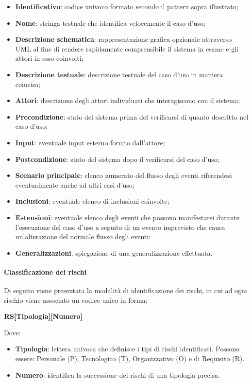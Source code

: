 \begin{itemize}
  \item \textbf{Identificativo}: codice univoco formato secondo il pattern sopra illustrato;
  \item \textbf{Nome}: stringa testuale che identifica velocemente il caso d'uso;
  \item \textbf{Descrizione schematica}: rappresentazione grafica opzionale attraverso UML al fine di rendere rapidamente comprensibile il sistema in esame e gli attori in esso coinvolti;
  \item \textbf{Descrizione testuale}: descrizione testuale del caso d'uso in maniera coincisa;
  \item \textbf{Attori}: descrizione degli attori individuati che interagiscono con il sistema;
  \item \textbf{Precondizione}: stato del sistema prima del verificarsi di quanto descritto nel caso d'uso;
  \item \textbf{Input}: eventuale input esterno fornito dall'attore;
  \item \textbf{Postcondizione}: stato del sistema dopo il verificarsi del caso d'uso;
  \item \textbf{Scenario principale}: elenco numerato del flusso degli eventi riferendosi eventualmente anche ad altri casi d'uso;
  \item \textbf{Inclusioni}: eventuale elenco di inclusioni coinvolte;
  \item \textbf{Estensioni}: eventuale elenco degli eventi che possono manifestarsi durante l'esecuzione del caso d'uso a seguito di un evento imprevisto che causa un'alterazione del normale flusso degli eventi;
  \item \textbf{Generalizzazioni}: spiegazione di una generalizzazione effettuata.
\end{itemize}

\paragraph{Classificazione dei rischi} \label{_classificazioneDeiRischi}
Di seguito viene presentata la modalità di identificazione dei rischi, in cui ad ogni rischio viene associato un codice unico in forma:
\begin{center}
	\textbf{RS[Tipologia][Numero]}
\end{center}
Dove: 
\begin{itemize}
	\item \textbf{Tipologia}: lettera univoca che definisce i tipi di rischi identificati. 
	\newline Possono essere: Personale (P), Tecnologico (T), Organizzativo (O) e di Requisito (R).
	\item \textbf{Numero}: identifica la successione dei rischi di una tipologia precisa.
\end{itemize}


